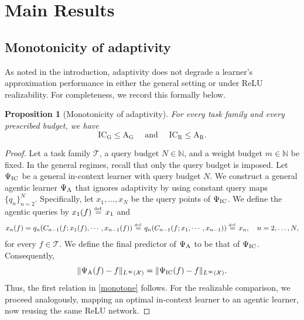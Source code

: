 \documentclass{article}
\newtheorem{proposition}{Proposition}[section]
\newcommand{\eqdef }{\ensuremath{\stackrel{\mbox{\upshape\tiny def.}}{=}}}
\newcommand{\ICG}{\mathrm{IC_G}}
\newcommand{\ICR}{\mathrm{IC_R}}
\newcommand{\AG}{\mathrm{A_G}}
\newcommand{\AR}{\mathrm{A_R}}
\begin{document}
\section{Main Results}
\label{s:Main}
\subsection{Monotonicity of adaptivity}
\label{s:Main__ss:Ad}

As noted in the introduction, %
adaptivity does not degrade
a learner's approximation performance %
in either the general setting or under ReLU realizability. 
For completeness, we record this formally below. 


\begin{proposition}[Monotonicity of adaptivity]
\label{prop:monotonicity}
For every task family and every prescribed budget, we have 
\begin{equation} \label{monotone}
    \ICG\leq \AG
    \quad \text{ and } \quad
    \ICR\leq \AR.
\end{equation}
\end{proposition}



\begin{proof}
Let a task family $\mathcal{T}$, a query budget $N\in\mathbb{N}$, and a weight budget $m\in\mathbb{N}$ be fixed.
In the general regimes, recall that only the query budget is imposed.
Let $\Psi_{\rm IC}$ be a general in-context learner with query budget $N$.
We construct a general agentic learner $\Psi_{\rm A}$ that ignores adaptivity by using constant query maps $\{q_n\}_{n=2}^N$. 
Specifically, let $x_1,\dots,x_N$ be the query points of $\Psi_{\rm IC}$.
We define the agentic queries by $x_1(f) \eqdef x_1$ and
\begin{align*}
    x_n(f) = q_n(C_{n-1}(f; x_1(f),\cdots,x_{n-1}(f)) \eqdef q_n(C_{n-1}(f; x_1,\cdots,x_{n-1})) \eqdef x_n, \quad n=2,\dots,N,
\end{align*}
for every $f\in\mathcal{T}$. 
We define the final predictor of $\Psi_{\rm A}$ to be that of $\Psi_{\rm IC}$.
Consequently, 
\begin{equation*}
    \|\Psi_{\rm A}(f) - f\|_{L^{\infty}(\mathcal{X})} =\|\Psi_{\rm IC}(f) - f\|_{L^{\infty}(\mathcal{X})}.
\end{equation*}
Thus, the first relation in \eqref{monotone} follows.
For the realizable comparison, we proceed analogously, mapping an optimal in-context learner to an agentic learner, now reusing the same ReLU network.
\end{proof}
\end{document}
